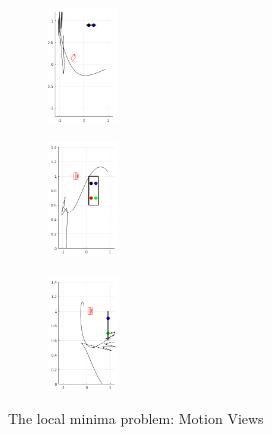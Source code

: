 \documentclass[a4paper,12pt]{article}
\begin{document}
\begin{figure}[tb]
         \begin{subfigure}[b]{0.32\textwidth}
        	\centering
	        \includegraphics[height=1.2in]{../results/demo5-XY.png}
		 \end{subfigure}
         \begin{subfigure}[b]{0.2\textwidth}
        	\centering
	        \includegraphics[height=1.2in]{../results/demo5-XZ.png}
		 \end{subfigure}%
         \begin{subfigure}[b]{0.32\textwidth}
        	\centering
	        \includegraphics[height=1.2in]{../results/demo5-YZ.png}
		 \end{subfigure}%
         \caption{The local minima problem: Motion Views} 
 	\label{fig:vdemo5} 
\end{figure}
\end{document}
